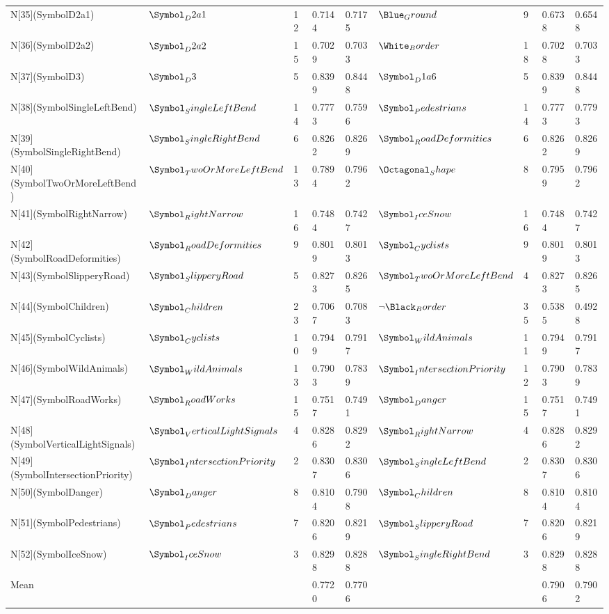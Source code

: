 \begin{tabular}{lllllllll}
N[35](SymbolD2a1) & $\Symbol_D2a1$ & 12 & 0.7144 & 0.7175 & $\Blue_Ground$ & 9 & 0.6738 & 0.6548 \\
N[36](SymbolD2a2) & $\Symbol_D2a2$ & 15 & 0.7029 & 0.7033 & $\White_Border$ & 18 & 0.7028 & 0.7033 \\
N[37](SymbolD3) & $\Symbol_D3$ & 5 & 0.8399 & 0.8448 & $\Symbol_D1a6$ & 5 & 0.8399 & 0.8448 \\
N[38](SymbolSingleLeftBend) & $\Symbol_SingleLeftBend$ & 14 & 0.7773 & 0.7596 & $\Symbol_Pedestrians$ & 14 & 0.7773 & 0.7793 \\
N[39](SymbolSingleRightBend) & $\Symbol_SingleRightBend$ & 6 & 0.8262 & 0.8269 & $\Symbol_RoadDeformities$ & 6 & 0.8262 & 0.8269 \\
N[40](SymbolTwoOrMoreLeftBend) & $\Symbol_TwoOrMoreLeftBend$ & 13 & 0.7894 & 0.7962 & $\Octagonal_Shape$ & 8 & 0.7959 & 0.7962 \\
N[41](SymbolRightNarrow) & $\Symbol_RightNarrow$ & 16 & 0.7484 & 0.7427 & $\Symbol_IceSnow$ & 16 & 0.7484 & 0.7427 \\
N[42](SymbolRoadDeformities) & $\Symbol_RoadDeformities$ & 9 & 0.8019 & 0.8013 & $\Symbol_Cyclists$ & 9 & 0.8019 & 0.8013 \\
N[43](SymbolSlipperyRoad) & $\Symbol_SlipperyRoad$ & 5 & 0.8273 & 0.8265 & $\Symbol_TwoOrMoreLeftBend$ & 4 & 0.8273 & 0.8265 \\
N[44](SymbolChildren) & $\Symbol_Children$ & 23 & 0.7067 & 0.7083 & $\neg \Black_Border$ & 35 & 0.5385 & 0.4928 \\
N[45](SymbolCyclists) & $\Symbol_Cyclists$ & 10 & 0.7949 & 0.7917 & $\Symbol_WildAnimals$ & 11 & 0.7949 & 0.7917 \\
N[46](SymbolWildAnimals) & $\Symbol_WildAnimals$ & 13 & 0.7903 & 0.7839 & $\Symbol_IntersectionPriority$ & 12 & 0.7903 & 0.7839 \\
N[47](SymbolRoadWorks) & $\Symbol_RoadWorks$ & 15 & 0.7517 & 0.7491 & $\Symbol_Danger$ & 15 & 0.7517 & 0.7491 \\
N[48](SymbolVerticalLightSignals) & $\Symbol_VerticalLightSignals$ & 4 & 0.8286 & 0.8292 & $\Symbol_RightNarrow$ & 4 & 0.8286 & 0.8292 \\
N[49](SymbolIntersectionPriority) & $\Symbol_IntersectionPriority$ & 2 & 0.8307 & 0.8306 & $\Symbol_SingleLeftBend$ & 2 & 0.8307 & 0.8306 \\
N[50](SymbolDanger) & $\Symbol_Danger$ & 8 & 0.8104 & 0.7908 & $\Symbol_Children$ & 8 & 0.8104 & 0.8104 \\
N[51](SymbolPedestrians) & $\Symbol_Pedestrians$ & 7 & 0.8206 & 0.8219 & $\Symbol_SlipperyRoad$ & 7 & 0.8206 & 0.8219 \\
N[52](SymbolIceSnow) & $\Symbol_IceSnow$ & 3 & 0.8298 & 0.8288 & $\Symbol_SingleRightBend$ & 3 & 0.8298 & 0.8288 \\
Mean &  &  & 0.7720 & 0.7706 &  &  & 0.7906 & 0.7902 \\
\bottomrule
\end{tabular}
